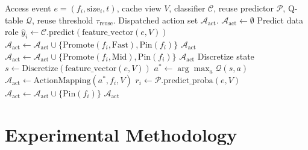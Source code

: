 \documentclass[conference]{IEEEtran}
\begin{document}
\begin{algorithm}[t]
\caption{ContextTier Online Placement and Tiering Engine}
\label{alg:contexttier}
\begin{algorithmic}[1]
\REQUIRE Access event $e = (f_i, \text{size}_i, t)$, cache view $V$, classifier $\mathcal{C}$, reuse predictor $\mathcal{P}$, Q-table $\mathcal{Q}$, reuse threshold $\tau_{\text{reuse}}$.
\ENSURE Dispatched action set $\mathcal{A}_{\text{act}}$.
\STATE $\mathcal{A}_{\text{act}} \leftarrow \emptyset$
\STATE Predict data role $\hat{y}_i \leftarrow \mathcal{C}.\text{predict}(\text{feature\_vector}(e, V))$
        \STATE $\mathcal{A}_{\text{act}} \leftarrow \mathcal{A}_{\text{act}} \cup \{\text{Promote}(f_i, \text{Fast}), \text{Pin}(f_i)\}$
    \ENDIF
    \RETURN $\mathcal{A}_{\text{act}}$
        \STATE $\mathcal{A}_{\text{act}} \leftarrow \mathcal{A}_{\text{act}} \cup \{\text{Promote}(f_i, \text{Mid}), \text{Pin}(f_i)\}$
    \ENDIF
    \RETURN $\mathcal{A}_{\text{act}}$
\ENDIF
\STATE Discretize state $s \leftarrow \text{Discretize}(\text{feature\_vector}(e, V))$
\STATE $a^* \leftarrow \arg\max_{a} \mathcal{Q}(s, a)$ 
\STATE $\mathcal{A}_{\text{act}} \leftarrow \text{ActionMapping}(a^*, f_i, V)$
\STATE $r_i \leftarrow \mathcal{P}.\text{predict\_proba}(e, V)$ 
    \STATE $\mathcal{A}_{\text{act}} \leftarrow \mathcal{A}_{\text{act}} \cup \{\text{Pin}(f_i)\}$
\ENDIF
\RETURN $\mathcal{A}_{\text{act}}$
\end{algorithmic}
\end{algorithm}

\section{Experimental Methodology}
\label{sec:methodology}
\end{document}
